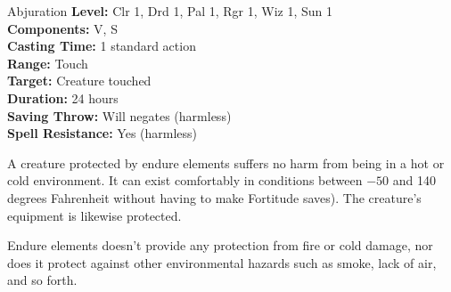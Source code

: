{Abjuration}
{
	\textbf{Level:}
	Clr 1, Drd 1, Pal 1, Rgr 1, Wiz 1, Sun 1\\
	\textbf{Components:}
	V, S\\
	\textbf{Casting Time:}
	1 standard action\\
	\textbf{Range:}
	Touch\\
	\textbf{Target:}
	Creature touched\\
	\textbf{Duration:}
	24 hours\\
	\textbf{Saving Throw:}
	Will negates (harmless)\\
	\textbf{Spell Resistance:}
	Yes (harmless)\\
}
{
	A creature protected by endure elements suffers no harm from being in a hot or cold environment. It can exist comfortably in conditions between $-50$ and 140 degrees Fahrenheit without having to make Fortitude saves). The creature's equipment is likewise protected.

	Endure elements doesn't provide any protection from fire or cold damage, nor does it protect against other environmental hazards such as smoke, lack of air, and so forth.

}
